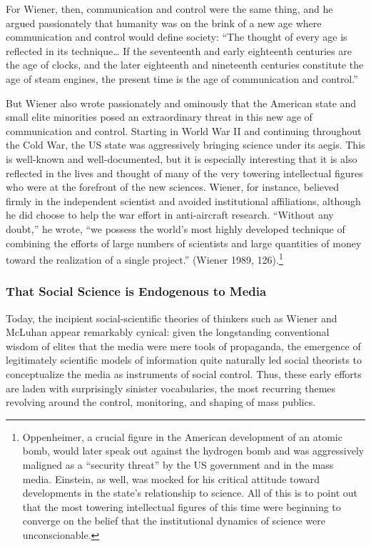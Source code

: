 \documentclass[12pt,book]{article}
\begin{document}
For Wiener, then, communication and control were the same thing, and he
argued passionately that humanity was on the brink of a new age where
communication and control would define society: ``The thought of every
age is reflected in its technique\ldots{} If the seventeenth and early
eighteenth centuries are the age of clocks, and the later eighteenth and
nineteenth centuries constitute the age of steam engines, the present
time is the age of communication and control.''

But Wiener also wrote passionately and ominously that the American state
and small elite minorities posed an extraordinary threat in this new age
of communication and control. Starting in World War II and continuing
throughout the Cold War, the US state was aggressively bringing science
under its aegis. This is well-known and well-documented, but it is
especially interesting that it is also reflected in the lives and
thought of many of the very towering intellectual figures who were at
the forefront of the new sciences. Wiener, for instance, believed firmly
in the independent scientist and avoided institutional affiliations,
although he did choose to help the war effort in anti-aircraft research.
``Without any doubt,'' he wrote, ``we possess the world's most highly
developed technique of combining the efforts of large numbers of
scientists and large quantities of money toward the realization of a
single project.'' (Wiener 1989, 126).\footnote{Oppenheimer, a crucial
  figure in the American development of an atomic bomb, would later
  speak out against the hydrogen bomb and was aggressively maligned as a
  ``security threat'' by the US government and in the mass media.
  Einstein, as well, was mocked for his critical attitude toward
  developments in the state's relationship to science. All of this is to
  point out that the most towering intellectual figures of this time
  were beginning to converge on the belief that the institutional
  dynamics of science were unconscionable.}

\subsubsection{That Social Science is Endogenous to
Media}\label{that-social-science-is-endogenous-to-media}

Today, the incipient social-scientific theories of thinkers such as
Wiener and McLuhan appear remarkably cynical: given the longstanding
conventional wisdom of elites that the media were mere tools of
propaganda, the emergence of legitimately scientific models of
information quite naturally led social theorists to conceptualize the
media as instruments of social control. Thus, these early efforts are
laden with surprisingly sinister vocabularies, the most recurring themes
revolving around the control, monitoring, and shaping of mass publics.
\end{document}
